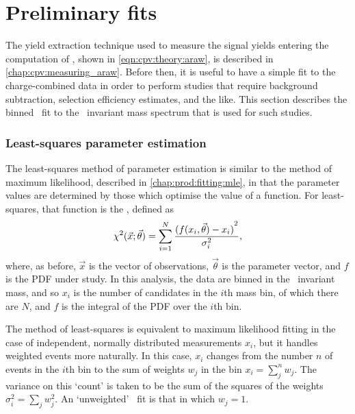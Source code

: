 \chapter{Preliminary fits}
\label{chap:cpv:prelim_fits}

The yield extraction technique used to measure the signal yields entering the 
computation of \ARaw, shown in \cref{eqn:cpv:theory:araw}, is described in 
\cref{chap:cpv:measuring_araw}.
Before then, it is useful to have a simple fit to the charge-combined data in 
order to perform studies that require background subtraction, selection 
efficiency estimates, and the like.
This section describes the binned \chisq\ fit to the \phh\ invariant mass 
spectrum that is used for such studies.

\subsection{Least-squares parameter estimation}
\label{chap:cpv:prelim_fits:least_squares}

The least-squares method of parameter estimation is similar to the method of 
maximum likelihood, described in \cref{chap:prod:fitting:mle}, in that the 
parameter values are determined by those which optimise the value of a 
function.
For least-squares, that function is the \chisq, defined as
\begin{equation}
  \chisq(\vec{x}; \vec{\theta}) = \sum_{i = 1}^{N} \frac{%
    {(f(x_{i}, \vec{\theta}) - x_{i})}^{2}
  }{%
    \sigma_{i}^{2}
  },
\end{equation}
where, as before, $\vec{x}$ is the vector of observations, $\vec{\theta}$ is 
the parameter vector, and $f$ is the \ac{PDF} under study.
In this analysis, the data are binned in the \phh\ invariant mass, and so 
$x_{i}$ is the number of candidates in the $i$th mass bin, of which there are 
$N$, and $f$ is the integral of the \ac{PDF} over the $i$th bin.\footnotemark


The method of least-squares is equivalent to maximum likelihood fitting in the 
case of independent, normally distributed measurements $x_{i}$, but it handles 
weighted events more naturally.
In this case, $x_{i}$ changes from the number $n$ of events in the $i$th bin to 
the sum of weights $w_{j}$ in the bin $x_{i} = \sum_{j}^{n} w_{j}$.
The variance on this `count' is taken to be the sum of the squares of the 
weights $\sigma_{i}^{2} = \sum_{j} w_{j}^{2}$.
An `unweighted' \chisq\ fit is that in which $w_{j} = 1$.

